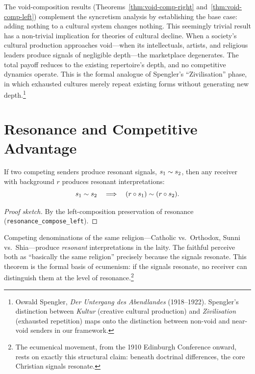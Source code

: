 The void-composition results (Theorems~\ref{thm:void-comp-right}
and~\ref{thm:void-comp-left}) complement the syncretism analysis by
establishing the base case: adding nothing to a cultural system changes
nothing.  This seemingly trivial result has a non-trivial implication for
theories of cultural decline.  When a society's cultural production
approaches void---when its intellectuals, artists, and religious
leaders produce signals of negligible depth---the marketplace degenerates.
The total payoff reduces to the existing repertoire's depth, and no
competitive dynamics operate.  This is the formal analogue of Spengler's
``Zivilisation'' phase, in which exhausted cultures merely repeat existing
forms without generating new depth.\footnote{Oswald Spengler,
\textit{Der Untergang des Abendlandes} (1918--1922).  Spengler's
distinction between \emph{Kultur} (creative cultural production) and
\emph{Zivilisation} (exhausted repetition) maps onto the distinction
between non-void and near-void senders in our framework.}

\section{Resonance and Competitive Advantage}
\label{sec:ch11-resonance}

\begin{theorem}
\label{thm:resonant-competitors}
If two competing senders produce resonant signals, $s_1 \sim s_2$, then any
receiver with background $r$ produces resonant interpretations:
\[
  s_1 \sim s_2
  \quad\Longrightarrow\quad
  (r \circ s_1) \sim (r \circ s_2).
\]
\end{theorem}

\begin{proof}[Proof sketch]
By the left-composition preservation of resonance
(\texttt{resonance\_compose\_left}).
\end{proof}

Competing denominations of the same religion---Catholic vs.\ Orthodox, Sunni
vs.\ Shia---produce \emph{resonant} interpretations in the laity.  The
faithful perceive both as ``basically the same religion'' precisely because the
signals resonate.  This theorem is the formal basis of ecumenism: if the
signals resonate, no receiver can distinguish them at the level of
resonance.\footnote{The ecumenical movement, from the 1910 Edinburgh Conference
onward, rests on exactly this structural claim: beneath doctrinal differences,
the core Christian signals resonate.}

